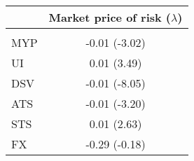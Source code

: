 \begin{table}
\centering
\begin{tabular}{l*{1}{c}}
\hline
& Market price of risk ($\lambda$)\\
\hline
\\
MYP & -0.01 (-3.02)\\
UI & 0.01 (3.49)\\
DSV & -0.01 (-8.05)\\
ATS & -0.01 (-3.20)\\
STS & 0.01 (2.63)\\
FX & -0.29 (-0.18)\\
\hline
\end{tabular}
\end{table}
